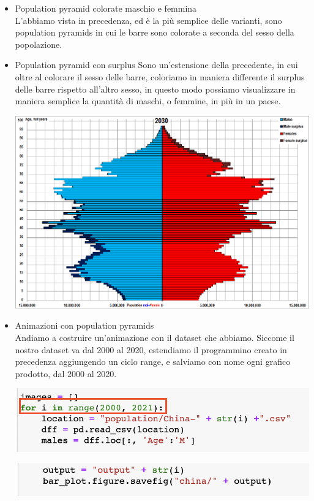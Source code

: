 \documentclass[11pt, oneside]{article}   	%
\begin{document}
\begin{itemize}
\item Population pyramid colorate maschio e femmina\\
L'abbiamo vista in precedenza, ed è la più semplice delle varianti, sono population pyramids in cui le barre sono colorate a seconda del sesso della popolazione.
\item Population pyramid con surplus
Sono un'estensione della precedente, in cui oltre al colorare il sesso delle barre, coloriamo in maniera differente il surplus delle barre rispetto all'altro sesso, in questo modo possiamo visualizzare in maniera semplice la quantità di maschi, o femmine, in più in un paese.
\begin{center}
\includegraphics[scale=0.6]{china}
\end{center}
\item Animazioni con population pyramids\\
Andiamo a costruire un'animazione con il dataset che abbiamo.
Siccome il nostro dataset va dal 2000 al 2020, estendiamo il programmino creato in precedenza aggiungendo un ciclo range, e salviamo con nome ogni grafico prodotto, dal 2000 al 2020.

\begin{center}
\includegraphics[scale=0.5]{china1}

\includegraphics[scale=0.55]{china2}


\end{center}
\end{itemize}
\end{document}
